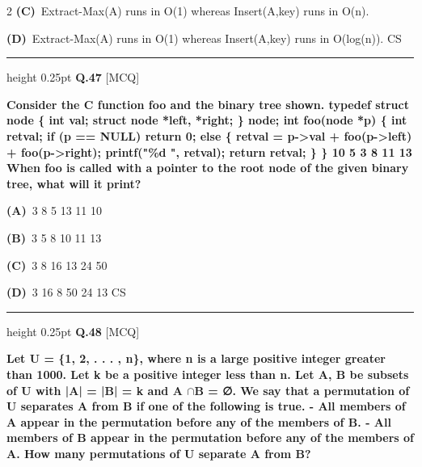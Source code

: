\documentclass[a4paper,10pt,twoside]{article}
\begin{document}
\begin{multicols}{2}
\textbf{(C)}~Extract-Max(A) runs in O(1) whereas Insert(A,key) runs in O(n).\par\vspace{2pt}\noindent
\textbf{(D)}~Extract-Max(A) runs in O(1) whereas Insert(A,key) runs in O(log(n)). \newline CS
\par\vspace{6pt}\hrule height 0.25pt\vspace{6pt}
\noindent\textbf{Q.47} \hfill {\footnotesize\textsf{[MCQ]}}
\par\vspace{2pt}
{\bfseries Consider the C function foo and the binary tree shown.
typedef struct node \{
int val;
struct node *left, *right;
\} node;
int foo(node *p) \{
int retval;
if (p == NULL)
return 0;
else \{
retval = p->val + foo(p->left) + foo(p->right);
printf("\%d ", retval);
return retval;
\}
\}
10
5
3
8
11
13
When foo is called with a pointer to the root node of the given binary tree, what
will it print? \par}
\par\vspace{2pt}\noindent
\textbf{(A)}~3 8 5 13 11 10\par\vspace{2pt}\noindent
\textbf{(B)}~3 5 8 10 11 13\par\vspace{2pt}\noindent
\textbf{(C)}~3 8 16 13 24 50\par\vspace{2pt}\noindent
\textbf{(D)}~3 16 8 50 24 13 \newline CS
\par\vspace{6pt}\hrule height 0.25pt\vspace{6pt}
\noindent\textbf{Q.48} \hfill {\footnotesize\textsf{[MCQ]}}
\par\vspace{2pt}
{\bfseries Let U = \{1, 2, . . . , n\}, where n is a large positive integer greater than 1000. Let
k be a positive integer less than n. Let A, B be subsets of U with |A| = |B| = k
and A $\cap$B = ∅. We say that a permutation of U separates A from B if one of the
following is true.
- All members of A appear in the permutation before any of the members of B.
- All members of B appear in the permutation before any of the members of A.
How many permutations of U separate A from B? \par}
\par\vspace{2pt}\noindent

\end{multicols}
\end{document}
